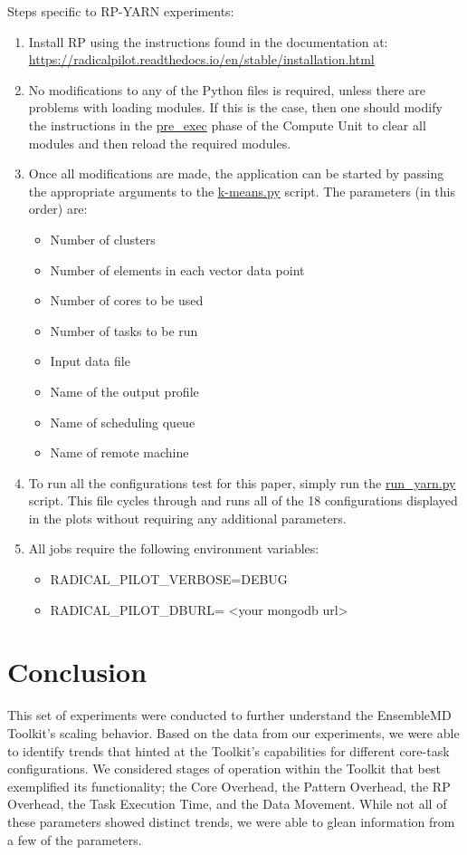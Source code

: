 \documentclass[]{article}
\begin{document}
		Steps specific to RP-YARN experiments:
		\begin{enumerate}
			\item Install RP using the instructions found in the documentation at: \\
			  \url{https://radicalpilot.readthedocs.io/en/stable/installation.html}
			\item No modifications to any of the Python files is required, unless there are problems with loading modules. If this is the case, then one should modify the instructions in the \url{pre_exec} phase of the Compute Unit to clear all modules and then reload the required modules.
			\item Once all modifications are made, the application can be started by passing the appropriate arguments to the \url{k-means.py} script. The parameters (in this order) are:
			\begin{itemize}
				\item Number of clusters
				\item Number of elements in each vector data point
				\item Number of cores to be used
				\item Number of tasks to be run
				\item Input data file
				\item Name of the output profile
				\item Name of scheduling queue
				\item Name of remote machine
			\end{itemize}
			\item To run all the configurations test for this paper, simply run the \url{run_yarn.py} script. This file cycles through and runs all of the 18 configurations displayed in the plots without requiring any additional parameters.
			\item All jobs require the following environment variables:
			\begin{itemize}
				\item RADICAL\_PILOT\_VERBOSE=DEBUG
				\item RADICAL\_PILOT\_DBURL= <your mongodb url>
			\end{itemize}
		\end{enumerate}

\section{Conclusion}
	This set of experiments were conducted to further understand the EnsembleMD Toolkit's scaling behavior. Based on the data from our experiments, we were able to identify trends that hinted at the Toolkit's capabilities for different core-task configurations. We considered stages of operation within the Toolkit that best exemplified its functionality; the Core Overhead, the Pattern Overhead, the RP Overhead, the Task Execution Time, and the Data Movement. While not all of these parameters showed distinct trends, we were able to glean information from a few of the parameters.
\end{document}
